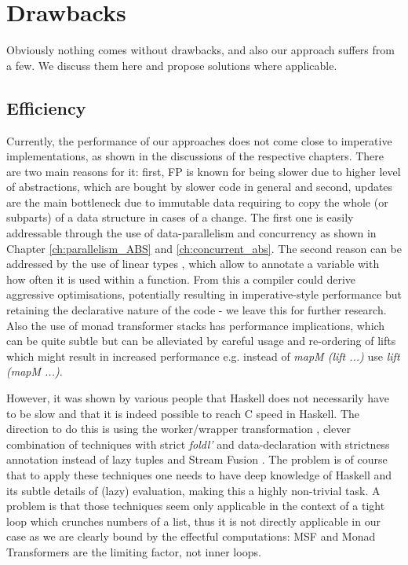 \section{Drawbacks}
\label{sec:drawbacks}
Obviously nothing comes without drawbacks, and also our approach suffers from a few. We discuss them here and propose solutions where applicable.

\subsection{Efficiency}
\label{sec:drawback_efficiency}
Currently, the performance of our approaches does not come close to imperative implementations, as shown in the discussions of the respective chapters. There are two main reasons for it: first, FP is known for being slower due to higher level of abstractions, which are bought by slower code in general and second, updates are the main bottleneck due to immutable data requiring to copy the whole (or subparts) of a data structure in cases of a change. The first one is easily addressable through the use of data-parallelism and concurrency as shown in Chapter \ref{ch:parallelism_ABS} and \ref{ch:concurrent_abs}. The second reason can be addressed by the use of linear types \cite{bernardy_linear_2017}, which allow to annotate a variable with how often it is used within a function. From this a compiler could derive aggressive optimisations, potentially resulting in imperative-style performance but retaining the declarative nature of the code - we leave this for further research. Also the use of monad transformer stacks has performance implications, which can be quite subtle but can be alleviated by careful usage and re-ordering of lifts which might result in increased performance e.g. instead of \textit{mapM (lift ...)} use \textit{lift (mapM ...)}.

However, it was shown by various people \cite{kqr_competing_2017, stewart_haskell_2008, stolarek_haskell_2013} that Haskell does not necessarily have to be slow and that it is indeed possible to reach C speed in Haskell. The direction to do this is using the worker/wrapper transformation \cite{gill_worker/wrapper_2009}, clever combination of techniques with strict \textit{foldl'} and data-declaration with strictness annotation instead of lazy tuples and Stream Fusion \cite{coutts_stream_2007, mainland_haskell_2013}. The problem is of course that to apply these techniques one needs to have deep knowledge of Haskell and its subtle details of (lazy) evaluation, making this a highly non-trivial task. A problem is that those techniques seem only applicable in the context of a tight loop which crunches numbers of a list, thus it is not directly applicable in our case as we are clearly bound by the effectful computations: MSF and Monad Transformers are the limiting factor, not inner loops.

